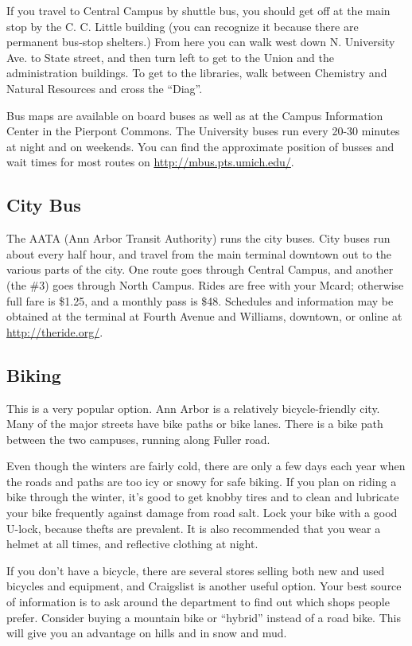 \documentclass[11pt]{article}
\begin{document}
If you travel to Central Campus by shuttle bus, you should get off at
the main stop by the C. C. Little building (you can recognize it
because there are permanent bus-stop shelters.)  From here you can
walk west down N. University Ave. to State street, and then turn left
to get to the Union and the administration buildings.  To get to the
libraries, walk between Chemistry and Natural Resources and cross the
“Diag”.

Bus maps are available on board buses as well as at the Campus
Information Center in the Pierpont Commons.  The University buses run
every 20-30 minutes at night and on weekends.  You can find the
approximate position of busses and wait times for most routes on
\href{http://mbus.pts.umich.edu/}{http://mbus.pts.umich.edu/}.
\subsection{City Bus}
\label{sec-11_2}

The AATA (Ann Arbor Transit Authority) runs the city buses.  City
buses run about every half hour, and travel from the main terminal
downtown out to the various parts of the city.  One route goes through
Central Campus, and another (the \#3) goes through North Campus.  Rides
are free with your Mcard; otherwise full fare is \$1.25, and a monthly
pass is \$48.  Schedules and information may be obtained at the
terminal at Fourth Avenue and Williams, downtown, or online at
\href{http://theride.org/}{http://theride.org/}.
\subsection{Biking}
\label{sec-11_3}

This is a very popular option.  Ann Arbor is a relatively
bicycle-friendly city.  Many of the major streets have bike paths or
bike lanes.  There is a bike path between the two campuses, running
along Fuller road.

Even though the winters are fairly cold, there are only a few days
each year when the roads and paths are too icy or snowy for safe
biking.  If you plan on riding a bike through the winter, it's good to
get knobby tires and to clean and lubricate your bike frequently
against damage from road salt.  Lock your bike with a good U-lock,
because thefts are prevalent.  It is also recommended that you wear a
helmet at all times, and reflective clothing at night.

If you don't have a bicycle, there are several stores selling both new
and used bicycles and equipment, and Craigslist is another useful
option.  Your best source of information is to ask around the
department to find out which shops people prefer.  Consider buying a
mountain bike or “hybrid” instead of a road bike.  This will give you
an advantage on hills and in snow and mud.
\end{document}
